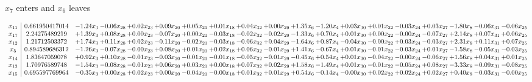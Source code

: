 \documentclass[9pt]{article}
\begin{document}
 $ x_{7} $ enters and $ x_{6} $ leaves 

 \[\begin{array}{c| c c@{\hskip 2pt} c@{\hskip 2pt} c@{\hskip 2pt} c@{\hskip 2pt} c@{\hskip 2pt} c@{\hskip 2pt} c@{\hskip 2pt} c@{\hskip 2pt} c@{\hskip 2pt} c@{\hskip 2pt} c@{\hskip 2pt} c@{\hskip 2pt} c@{\hskip 2pt} c@{\hskip 2pt} c@{\hskip 2pt} c@{\hskip 2pt} c@{\hskip 2pt} }
 x_{11}   &  0.661950417014 & -1.24 x_{3} & -0.06 x_{28} & +  0.02 x_{23} & +  0.09 x_{20} & +  0.05 x_{21} & +  0.01 x_{18} & +  0.04 x_{32} & +  0.00 x_{29} & +  1.35 x_{6} & -1.20 x_{4} & +  0.03 x_{30} & +  0.01 x_{22} & -0.03 x_{24} & +  0.03 x_{27} & -1.80 x_{8} & -0.06 x_{31} & -0.06 x_{25}\\
 x_{17}   &  2.24275489219 & +  1.39 x_{3} & +  0.08 x_{28} & +  0.00 x_{23} & -0.07 x_{20} & +  0.00 x_{21} & -0.03 x_{18} & -0.02 x_{32} & -0.02 x_{29} & -1.33 x_{6} & +  0.70 x_{4} & +  0.01 x_{30} & +  0.00 x_{22} & -0.00 x_{24} & -0.07 x_{27} & +  2.14 x_{8} & +  0.07 x_{31} & +  0.06 x_{25}\\
 x_{12}   &  1.21712503372 & +  1.74 x_{3} & +  0.11 x_{28} & +  0.02 x_{23} & -0.11 x_{20} & -0.02 x_{21} & -0.03 x_{18} & -0.06 x_{32} & +  0.04 x_{29} & -1.64 x_{6} & +  0.87 x_{4} & -0.04 x_{30} & -0.00 x_{22} & +  0.03 x_{24} & -0.03 x_{27} & +  2.31 x_{8} & +  0.11 x_{31} & +  0.07 x_{25}\\
 x_{5}   &  0.894589686312 & -1.26 x_{3} & -0.07 x_{28} & -0.00 x_{23} & +  0.08 x_{20} & +  0.01 x_{21} & +  0.02 x_{18} & +  0.06 x_{32} & -0.01 x_{29} & +  1.41 x_{6} & -0.67 x_{4} & +  0.01 x_{30} & -0.01 x_{22} & -0.03 x_{24} & +  0.01 x_{27} & -1.58 x_{8} & -0.05 x_{31} & -0.03 x_{25}\\
 x_{14}   &  1.83647059078 & +  0.92 x_{3} & +  0.10 x_{28} & -0.01 x_{23} & -0.03 x_{20} & -0.01 x_{21} & -0.01 x_{18} & -0.05 x_{32} & -0.01 x_{29} & -0.45 x_{6} & +  0.54 x_{4} & +  0.01 x_{30} & -0.04 x_{22} & -0.00 x_{24} & -0.06 x_{27} & +  1.56 x_{8} & +  0.04 x_{31} & +  0.01 x_{25}\\
 x_{13}   &  1.70976589748 & -1.54 x_{3} & -0.08 x_{28} & -0.01 x_{23} & +  0.06 x_{20} & +  0.03 x_{21} & +  0.00 x_{18} & +  0.07 x_{32} & +  0.02 x_{29} & +  1.58 x_{6} & -1.49 x_{4} & +  0.01 x_{30} & -0.01 x_{22} & -0.05 x_{24} & +  0.08 x_{27} & -3.33 x_{8} & -0.09 x_{31} & -0.08 x_{25}\\
 x_{15}   &  0.695597769964 & -0.35 x_{3} & +  0.00 x_{28} & +  0.02 x_{23} & +  0.00 x_{20} & -0.04 x_{21} & -0.00 x_{18} & +  0.01 x_{32} & +  0.01 x_{29} & +  0.54 x_{6} & -0.14 x_{4} & -0.00 x_{30} & +  0.02 x_{22} & +  0.02 x_{24} & +  0.02 x_{27} & +  0.40 x_{8} & -0.03 x_{31} & -0.00 x_{25}\\

\end{array}\]
\end{document}
